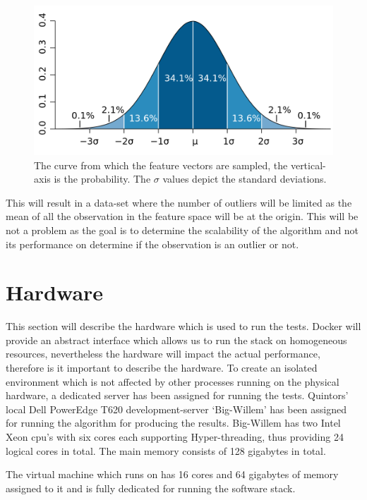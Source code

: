 \begin{figure}[ht!]
\centering
\includegraphics[width=\textwidth]{figures/bellcurve.png}
\caption[Standard normal distribution]{The curve from which the feature vectors are sampled, the vertical-axis is the probability. The $\sigma$ values depict the standard deviations. \label{gaussianDistribution}}
\end{figure}

This will result in a data-set where the number of outliers will be limited as the mean of all the observation in the feature space will be at the origin. This will be not a problem as the goal is to determine the scalability of the algorithm and not its performance on determine if the observation is an outlier or not.

\section{Hardware \label{sec:hardware}}
This section will describe the hardware which is used to run the tests. Docker will provide an abstract interface which allows us to run the stack on homogeneous resources, nevertheless the hardware will impact the actual performance, therefore is it important to describe the hardware. To create an isolated environment which is not affected by other processes running on the physical hardware, a dedicated server has been assigned for running the tests. Quintors' local Dell PowerEdge T620 development-server `Big-Willem' has been assigned for running the algorithm for producing the results. Big-Willem has two Intel Xeon cpu's with six cores each supporting Hyper-threading, thus providing 24 logical cores in total. The main memory consists of 128 gigabytes in total. 

The virtual machine which runs on has 16 cores and 64 gigabytes of memory assigned to it and is fully dedicated for running the software stack.

